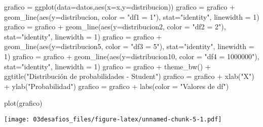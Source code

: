 \documentclass[
]{article}
\newenvironment{Shaded}{\begin{snugshade}}{\end{snugshade}}
\newcommand{\AttributeTok}[1]{\textcolor[rgb]{0.77,0.63,0.00}{#1}}
\newcommand{\DecValTok}[1]{\textcolor[rgb]{0.00,0.00,0.81}{#1}}
\newcommand{\FunctionTok}[1]{\textcolor[rgb]{0.00,0.00,0.00}{#1}}
\newcommand{\NormalTok}[1]{#1}
\newcommand{\OtherTok}[1]{\textcolor[rgb]{0.56,0.35,0.01}{#1}}
\newcommand{\SpecialCharTok}[1]{\textcolor[rgb]{0.00,0.00,0.00}{#1}}
\newcommand{\StringTok}[1]{\textcolor[rgb]{0.31,0.60,0.02}{#1}}
\begin{document}
\begin{Shaded}
\begin{Highlighting}[]
\NormalTok{grafico }\OtherTok{=} \FunctionTok{ggplot}\NormalTok{(}\AttributeTok{data=}\NormalTok{datos,}\FunctionTok{aes}\NormalTok{(}\AttributeTok{x=}\NormalTok{x,}\AttributeTok{y=}\NormalTok{distribucion))}
\NormalTok{grafico }\OtherTok{=}\NormalTok{ grafico }\SpecialCharTok{+} \FunctionTok{geom\_line}\NormalTok{(}\FunctionTok{aes}\NormalTok{(}\AttributeTok{y=}\NormalTok{distribucion, }\AttributeTok{color =} \StringTok{"df1 = 1"}\NormalTok{), }\AttributeTok{stat=}\StringTok{"identity"}\NormalTok{, }\AttributeTok{linewidth =} \DecValTok{1}\NormalTok{)}
\NormalTok{grafico }\OtherTok{=}\NormalTok{ grafico }\SpecialCharTok{+} \FunctionTok{geom\_line}\NormalTok{(}\FunctionTok{aes}\NormalTok{(}\AttributeTok{y=}\NormalTok{distribucion2, }\AttributeTok{color =} \StringTok{"df2 = 2"}\NormalTok{), }\AttributeTok{stat=}\StringTok{"identity"}\NormalTok{, }\AttributeTok{linewidth =} \DecValTok{1}\NormalTok{)}
\NormalTok{grafico }\OtherTok{=}\NormalTok{ grafico }\SpecialCharTok{+} \FunctionTok{geom\_line}\NormalTok{(}\FunctionTok{aes}\NormalTok{(}\AttributeTok{y=}\NormalTok{distribucion5, }\AttributeTok{color =} \StringTok{"df3 = 5"}\NormalTok{), }\AttributeTok{stat=}\StringTok{"identity"}\NormalTok{, }\AttributeTok{linewidth =} \DecValTok{1}\NormalTok{)}
\NormalTok{grafico }\OtherTok{=}\NormalTok{ grafico }\SpecialCharTok{+} \FunctionTok{geom\_line}\NormalTok{(}\FunctionTok{aes}\NormalTok{(}\AttributeTok{y=}\NormalTok{distribucion10, }\AttributeTok{color =} \StringTok{"df4 = 1000000"}\NormalTok{), }\AttributeTok{stat=}\StringTok{"identity"}\NormalTok{, }\AttributeTok{linewidth =} \DecValTok{1}\NormalTok{)}
\NormalTok{grafico }\OtherTok{=}\NormalTok{ grafico }\SpecialCharTok{+} \FunctionTok{theme\_bw}\NormalTok{() }\SpecialCharTok{+} \FunctionTok{ggtitle}\NormalTok{(}\StringTok{"Distribución de probabilidades {-} Student"}\NormalTok{)}
\NormalTok{grafico }\OtherTok{=}\NormalTok{ grafico }\SpecialCharTok{+} \FunctionTok{xlab}\NormalTok{(}\StringTok{"X"}\NormalTok{) }\SpecialCharTok{+} \FunctionTok{ylab}\NormalTok{(}\StringTok{"Probabilidad"}\NormalTok{)}
\NormalTok{grafico }\OtherTok{=}\NormalTok{ grafico }\SpecialCharTok{+} \FunctionTok{labs}\NormalTok{(}\AttributeTok{color =} \StringTok{"Valores de df"}\NormalTok{)}

\FunctionTok{plot}\NormalTok{(grafico)}
\end{Highlighting}
\end{Shaded}

\texttt{[image: 03desafios\_files/figure-latex/unnamed-chunk-5-1.pdf]}
\end{document}
